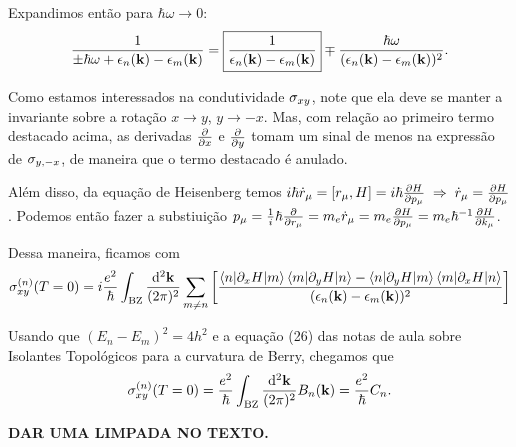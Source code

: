 \documentclass[a4paper,10pt]{article}
\begin{document}
Expandimos então para $\hbar \omega \to 0$:
$$
\frac{1}{\pm \hbar \omega + \epsilon_n(\vb{k}) - \epsilon_m(\vb{k})} =
\boxed{\frac{1}{\epsilon_n(\vb{k}) - \epsilon_m(\vb{k})}}
\mp \frac{\hbar\omega}{(\epsilon_n(\vb{k}) - \epsilon_m(\vb{k}))^2}.
$$

Como estamos interessados na condutividade $\sigma_{xy}$, note que ela deve se manter a invariante sobre a rotação $x \to y$, $y \to -x$. Mas, com relação ao primeiro termo destacado acima, as derivadas $\pdv{x}$ e $\pdv{y}$ tomam um sinal de menos na expressão de $\sigma_{y,-x}$, de maneira que o termo destacado é anulado.

Além disso, da equação de Heisenberg temos $i\hbar \dot{r}_\mu = [r_\mu, H] = i\hbar \pdv{H}{p_\mu} \; \Rightarrow \; \dot{r}_\mu = \pdv{H}{p_\mu}$. Podemos então fazer a substiuição $p_\mu = \frac{1}{i} \hbar \pdv{r_\mu} = m_e \dot{r}_\mu = m_e \pdv{H}{p_\mu} = m_e \hbar^{-1} \pdv{H}{k_\mu}$.

Dessa maneira, ficamos com
$$
\sigma^{(n)}_{xy}(T=0) =i\frac{e^2}{\hbar}\int_{\text{BZ}}\frac{\dd[2]{\vb{k}}}{(2\pi)^2}
\sum_{m\neq n}
\qty[
\frac{
\mel**{n}{\partial_x H}{m} \mel**{m}{\partial_y H}{n} -
\mel**{n}{\partial_y H}{m} \mel**{m}{\partial_x H}{n}
}{(\epsilon_n(\vb{k}) - \epsilon_{m}(\vb{k}))^2} ]
$$

Usando que $(E_n - E_m)^2 = 4h^2$ e a equação (26) das notas de aula sobre Isolantes Topológicos para a curvatura de Berry, chegamos que
$$
\sigma^{(n)}_{xy}(T=0) =
\frac{e^2}{\hbar} \int_{\text{BZ}} \frac{\dd[2]{\vb{k}}}{(2\pi)^2} B_n(\vb{k}) =
\frac{e^2}{\hbar} C_n.
$$

\textbf{DAR UMA LIMPADA NO TEXTO.}
\end{document}
